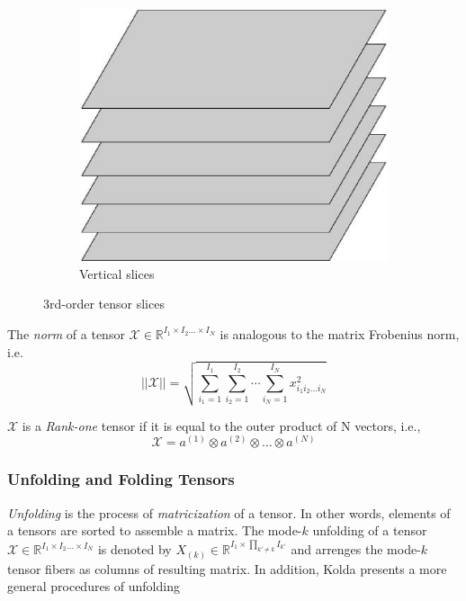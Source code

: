\documentclass[letterpaper,12pt]{article}
\begin{document}
\begin{figure}[!ht]
 \begin{subfigure}[b]{0.33\textwidth}
  \includegraphics[width=\textwidth]{Images/slices-vertical.eps}
  \caption{Vertical slices}\label{fig:3tensor-verticalslices}
 \end{subfigure}
\caption{3rd-order tensor slices}\label{fig:3tensor-slices}
\end{figure}

The \textit{norm} of a tensor $\mathcal{X}\in \mathbb{R}^{I_1\times I_2 \ldots \times I_N}$ is analogous to the matrix Frobenius norm, i.e.
\begin{equation}
||\mathcal{X}|| = \sqrt{\sum_{i_1=1}^{I_1}\sum_{i_2=1}^{I_2}\cdots\sum_{i_N=1}^{I_N} x_{i_1i_2\ldots i_N}^2 } 
\end{equation}\label{eq:Frobenius-norm}


$\mathcal{X}$ is a \textit{Rank-one} tensor if it is equal to the outer product of N vectors, i.e.,
\[
\mathcal{X} = a^{(1)}\otimes a^{(2)} \otimes \ldots \otimes a^{(N)}
\]



\subsubsection{Unfolding and Folding Tensors}

\textit{Unfolding} is the process of \textit{matricization} of a tensor. In other words, elements of a tensors are sorted to assemble a matrix. The mode-$k$ unfolding of a tensor $\mathcal{X}\in \mathbb{R}^{I_1\times I_2 \ldots \times I_N}$ is denoted by  $X_{(k)} \in \mathbb{R}^{I_1\times \prod_{k'\neq k}I_{k'} }$ and arrenges the mode-$k$ tensor fibers as columns of resulting matrix. In addition, Kolda \cite{Kolda2009} presents a more general procedures of unfolding
\end{document}
